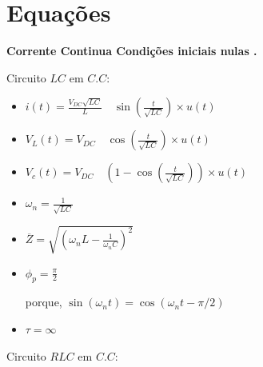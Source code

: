 \part{Equa\c{c}\~{o}es} \label{eq}
%
\begin{flushleft}
{\bf Corrente Continua Condi\c{c}\~{o}es  iniciais  nulas .}\par
\end{flushleft}
 \quad Circuito  $LC$ em $C.C$:\par
%
\begin{itemize}
\item
$i(t)=\frac{V_{DC}\sqrt{LC}}{L}\quad \sin \left( \frac{t}{\sqrt{LC}}\right)\times u(t)$\par
\item
$V_L(t)=V_{DC}\quad \cos\left(\frac{t}{\sqrt{LC}} \right)\times u(t)$\par
\item
$V_c(t)=V_{DC}\quad \left(1-\cos\left(\frac{t}{\sqrt{LC}} \right) \right)\times u(t)$\par
\item
$\omega_n=\frac{1}{\sqrt{LC}}$\par
\item
$\overline{Z}=\sqrt{(\omega_n L-\frac{1}{\omega_n C})^2}$\par
\item
$\phi_p=\frac{\pi}{2}$\par
porque, $\sin(\omega_n t)= \cos(\omega_n t - \pi/2)$\par
\item
$\tau=\infty$\par
\end{itemize}
%
\quad Circuito  $RLC$ em $C.C$:\par
%
